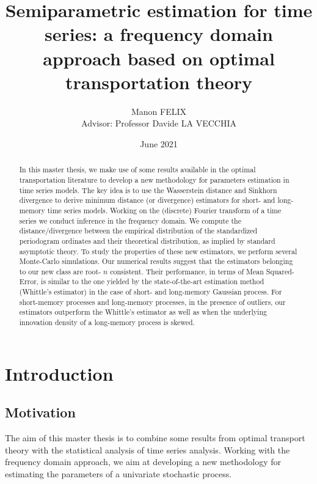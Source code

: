 \documentclass[
  11pt,
]{article}
\title{Semiparametric estimation for time series: a frequency domain
approach based on optimal transportation theory}
\author{Manon FELIX\\
Advisor: Professor Davide LA VECCHIA}
\date{June 2021}
\begin{document}
\maketitle
\begin{abstract}
In this master thesis, we make use of some results available in the
optimal transportation literature to develop a new methodology for
parameters estimation in time series models. The key idea is to use the
Wasserstein distance and Sinkhorn divergence to derive minimum distance
(or divergence) estimators for short- and long-memory time series
models. Working on the (discrete) Fourier transform of a time series we
conduct inference in the frequency domain. We compute the
distance/divergence between the empirical distribution of the
standardized periodogram ordinates and their theoretical distribution,
as implied by standard asymptotic theory. To study the properties of
these new estimators, we perform several Monte-Carlo simulations. Our
numerical results suggest that the estimators belonging to our new class
are root- \(n\) consistent. Their performance, in terms of Mean
Squared-Error, is similar to the one yielded by the state-of-the-art
estimation method (Whittle's estimator) in the case of short- and
long-memory Gaussian process. For short-memory processes and long-memory
processes, in the presence of outliers, our estimators outperform the
Whittle's estimator as well as when the underlying innovation density of
a long-memory process is skewed.
\end{abstract}

\newpage

\tableofcontents

\newpage

\hypertarget{introduction}{%
\section{Introduction}\label{introduction}}

\hypertarget{motivation}{%
\subsection{Motivation}\label{motivation}}

The aim of this master thesis is to combine some results from optimal
transport theory with the statistical analysis of time series analysis.
Working with the frequency domain approach, we aim at developing a new
methodology for estimating the parameters of a univariate stochastic
process.
\end{document}
